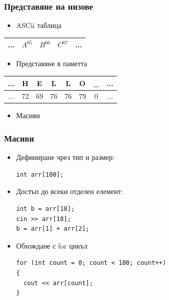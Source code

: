 \documentclass{beamer}
\begin{document}
\begin{frame}[fragile]
\frametitle{Представяне на низове}

\begin{itemize}
  \item ASCii таблица 
\end{itemize}

\begin{tabular}{c | c | c | c | c}
\hline
...&$A^{65}$&$B^{66}$&$C^{67}$&... \\\hline
  
\end{tabular}

\pause

\begin{itemize}
  \item Представяне в паметта 
\end{itemize}

\begin{tabular}{c | c | c | c | c | c | c | c}
\hline
...&H &E &L &L &O & \_ &... \\\hline
...&72&69&76&76&79& 0 &... \\\hline
\end{tabular}

\pause
\begin{itemize}
  \item Масиви
\end{itemize}


\end{frame}

\begin{frame}[fragile]
\frametitle{Масиви}

\begin{itemize}
  \item Дефиниране чрез тип и размер: 

\begin{lstlisting}
int arr[100];
\end{lstlisting}
\pause
  \item Достъп до всеки отделен елемент:

\begin{lstlisting}
int b = arr[18];
cin >> arr[18];
b = arr[1] + arr[2];
\end{lstlisting}
\pause

  \item Обхождане с for цикъл

\begin{lstlisting}
for (int count = 0; count < 100; count++)
{
  cout << arr[count];
}
\end{lstlisting}
\end{itemize}

\end{frame}
\end{document}
